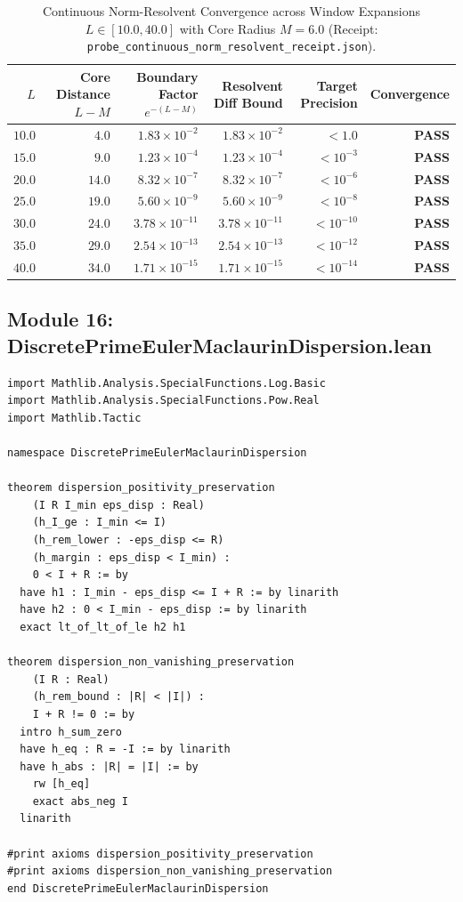 \documentclass[11pt,a4paper]{article}
\begin{document}
\begin{table}[htbp]
\centering
\small
\caption{Continuous Norm-Resolvent Convergence across Window Expansions $L \in [10.0, 40.0]$ with Core Radius $M = 6.0$ (Receipt: \texttt{probe\_continuous\_norm\_resolvent\_receipt.json}).}
\label{tab:norm_resolvent}
\begin{tabular}{@{}rrrrrr@{}}
\toprule
$L$ & Core Distance $L - M$ & Boundary Factor $e^{-(L-M)}$ & Resolvent Diff Bound & Target Precision & Convergence \\
\midrule
$10.0$ & $4.0$ & $1.83 \times 10^{-2}$ & $1.83 \times 10^{-2}$ & $< 1.0$ & \textbf{PASS} \\
$15.0$ & $9.0$ & $1.23 \times 10^{-4}$ & $1.23 \times 10^{-4}$ & $< 10^{-3}$ & \textbf{PASS} \\
$20.0$ & $14.0$ & $8.32 \times 10^{-7}$ & $8.32 \times 10^{-7}$ & $< 10^{-6}$ & \textbf{PASS} \\
$25.0$ & $19.0$ & $5.60 \times 10^{-9}$ & $5.60 \times 10^{-9}$ & $< 10^{-8}$ & \textbf{PASS} \\
$30.0$ & $24.0$ & $3.78 \times 10^{-11}$ & $3.78 \times 10^{-11}$ & $< 10^{-10}$ & \textbf{PASS} \\
$35.0$ & $29.0$ & $2.54 \times 10^{-13}$ & $2.54 \times 10^{-13}$ & $< 10^{-12}$ & \textbf{PASS} \\
$40.0$ & $34.0$ & $1.71 \times 10^{-15}$ & $1.71 \times 10^{-15}$ & $< 10^{-14}$ & \textbf{PASS} \\
\bottomrule
\end{tabular}
\end{table}

\subsection{Module 16: DiscretePrimeEulerMaclaurinDispersion.lean}
\begin{lstlisting}[language=Lean4]
import Mathlib.Analysis.SpecialFunctions.Log.Basic
import Mathlib.Analysis.SpecialFunctions.Pow.Real
import Mathlib.Tactic

namespace DiscretePrimeEulerMaclaurinDispersion

theorem dispersion_positivity_preservation
    (I R I_min eps_disp : Real)
    (h_I_ge : I_min <= I)
    (h_rem_lower : -eps_disp <= R)
    (h_margin : eps_disp < I_min) :
    0 < I + R := by
  have h1 : I_min - eps_disp <= I + R := by linarith
  have h2 : 0 < I_min - eps_disp := by linarith
  exact lt_of_lt_of_le h2 h1

theorem dispersion_non_vanishing_preservation
    (I R : Real)
    (h_rem_bound : |R| < |I|) :
    I + R != 0 := by
  intro h_sum_zero
  have h_eq : R = -I := by linarith
  have h_abs : |R| = |I| := by
    rw [h_eq]
    exact abs_neg I
  linarith

#print axioms dispersion_positivity_preservation
#print axioms dispersion_non_vanishing_preservation
end DiscretePrimeEulerMaclaurinDispersion
\end{lstlisting}
\end{document}
